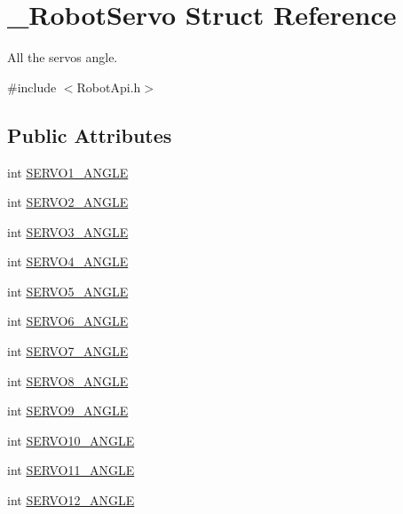 \hypertarget{struct__RobotServo}{\section{\-\_\-\-Robot\-Servo Struct Reference}
\label{struct__RobotServo}
}


All the servos angle.  




{\ttfamily \#include $<$Robot\-Api.\-h$>$}

\subsection*{Public Attributes}
\begin{DoxyCompactItemize}
\item 
int \hyperlink{struct__RobotServo_a1f1a8a3bbe5ead1dd6d601759a5ca98f}{S\-E\-R\-V\-O1\-\_\-\-A\-N\-G\-L\-E}
\item 
int \hyperlink{struct__RobotServo_afb1c3bb48d9ea043220aea87d53727b0}{S\-E\-R\-V\-O2\-\_\-\-A\-N\-G\-L\-E}
\item 
int \hyperlink{struct__RobotServo_ab11e8be260c447c377f2b00c1036d1a3}{S\-E\-R\-V\-O3\-\_\-\-A\-N\-G\-L\-E}
\item 
int \hyperlink{struct__RobotServo_a2812900c05863c2212a91adb1dcf8b2b}{S\-E\-R\-V\-O4\-\_\-\-A\-N\-G\-L\-E}
\item 
int \hyperlink{struct__RobotServo_aaacf4e0cf957dc248063ee6216b0235f}{S\-E\-R\-V\-O5\-\_\-\-A\-N\-G\-L\-E}
\item 
int \hyperlink{struct__RobotServo_ad5c48927ae8cd2377f25ae84e20a7474}{S\-E\-R\-V\-O6\-\_\-\-A\-N\-G\-L\-E}
\item 
int \hyperlink{struct__RobotServo_a4d9a37b2ebbf5446b3495965880232c3}{S\-E\-R\-V\-O7\-\_\-\-A\-N\-G\-L\-E}
\item 
int \hyperlink{struct__RobotServo_a996aa08a6ff475cc98c13d1fe43fa961}{S\-E\-R\-V\-O8\-\_\-\-A\-N\-G\-L\-E}
\item 
int \hyperlink{struct__RobotServo_a7c262cfcbbf1246556a7f7a23a35275f}{S\-E\-R\-V\-O9\-\_\-\-A\-N\-G\-L\-E}
\item 
int \hyperlink{struct__RobotServo_a49ee2878d449d0c5f9578abdc6ea7b67}{S\-E\-R\-V\-O10\-\_\-\-A\-N\-G\-L\-E}
\item 
int \hyperlink{struct__RobotServo_ad98e244e46ee9b7b66799a5afab0dd85}{S\-E\-R\-V\-O11\-\_\-\-A\-N\-G\-L\-E}
\item 
int \hyperlink{struct__RobotServo_a26ff7f43241c15f676aca403e4c1056b}{S\-E\-R\-V\-O12\-\_\-\-A\-N\-G\-L\-E}

\end{DoxyCompactItemize}
